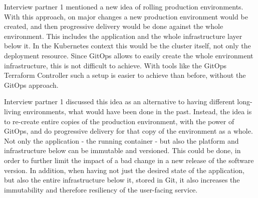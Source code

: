 Interview partner 1 mentioned a new idea of
rolling production environments.
With this approach,
on major changes a new production environment would be created,
and then progressive delivery would be done against the whole environment.
This includes the application and the whole infrastructure layer below it.
In the Kubernetes context this would be the cluster itself, not only the deployment resource.
Since GitOps allows to easily create the whole environment infrastructure,
this is not difficult to achieve.
With tools like the GitOps Terraform Controller
such a setup is easier to achieve than before, without the GitOps approach.


Interview partner 1 discussed this idea as an alternative to having different long-living environments,
what would have been done in the past.
Instead, the idea is to re-create entire copies of the production environment,
with the power of GitOps,
and do progressive delivery for that copy of the environment as a whole.
Not only the application - the running container - but also the platform and infrastructure below
can be immutable and versioned.
This could be done, in order to further limit the impact of a bad change in a new release of the software version.
In addition, when having not just the desired state of the application, but also the entire infrastructure below it,
stored in Git,
it also increases the immutability and therefore resiliency of the user-facing service.

